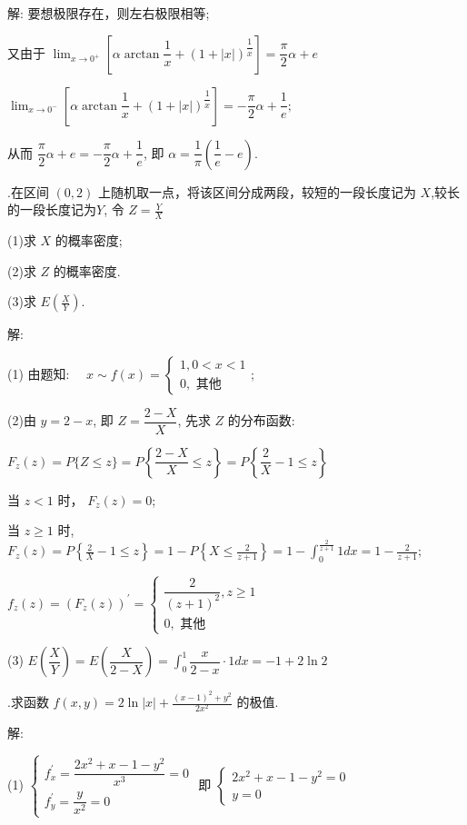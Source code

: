\documentclass{article}
\begin{document}
解: 要想极限存在，则左右极限相等;

又由于 $\lim _{x \rightarrow 0^{+}}\left[\alpha \arctan \dfrac{1}{x}+\left(1+|x|\right)^{\dfrac{1}{x}}\right]=\dfrac{\pi}{2} \alpha+e $

$\lim _{x \rightarrow 0^{-}}\left[\alpha \arctan \dfrac{1}{x}+(1+|x|)^{\dfrac{1}{x}}\right]=-\dfrac{\pi}{2} \alpha+\dfrac{1}{e} ;$

从而 $\dfrac{\pi}{2} \alpha+e=-\dfrac{\pi}{2} \alpha+\dfrac{1}{e}$, 即 $\alpha=\dfrac{1}{\pi}\left(\dfrac{1}{e}-e\right) .$

\vspace{1ex}
{.}在区间 $(0,2)$ 上随机取一点，将该区间分成两段，较短的一段长度记为 $X$,较长的一段长度记为$Y$, 令 $Z=\frac{Y}{X}$

(1)求 $X$ 的概率密度;

(2)求 $Z$ 的概率密度.

(3)求 $E\left(\frac{X}{Y}\right)$.

解:

(1) 由题知: $\quad x \sim f(x)=\left\{\begin{array}{c}
        1,0<x<1 \\
        0, \text { 其他 }
    \end{array} ;\right.$

(2)由 $y=2-x$, 即 $Z=\dfrac{2-X}{X}$, 先求 $Z$ 的分布函数:

$F_{z}(z)=P\{Z \leq z\}=P\left\{\dfrac{2-X}{X} \leq z\right\}=P\left\{\dfrac{2}{X}-1 \leq z\right\}$

当 $z<1$ 时， $F_{z}(z)=0$;

当 $z \geq 1$ 时, $F_{z}(z)=P\left\{\frac{2}{X}-1 \leq z\right\}=1-P\left\{X \leq \frac{2}{z+1}\right\}=1-\int_{0}^{\frac{2}{z+1}} 1 d x=1-\frac{2}{z+1} ;$

$f_{z}(z)=\left(F_{z}(z)\right)^{\prime}=\left\{\begin{array}{c}
        \dfrac{2}{(z+1)^{2}}, z \geq 1 \\
        0, \text { 其他 }
    \end{array}\right.$

(3) $E\left(\dfrac{X}{Y}\right)=E\left(\dfrac{X}{2-X}\right)=\int_{0}^{1} \dfrac{x}{2-x} \cdot 1 d x=-1+2 \ln 2$

\vspace{1ex}
{.}求函数 $f(x, y)=2 \ln |x|+\frac{(x-1)^{2}+y^{2}}{2 x^{2}}$ 的极值.

解:

(1) $\left\{\begin{array}{l}
        f_{x}^{\prime}=\dfrac{2 x^{2}+x-1-y^{2}}{x^{3}}=0 \\
        f_{y}^{\prime}=\dfrac{y}{x^{2}}=0
    \end{array}\right.$ 即 $\left\{\begin{array}{l}
        2 x^{2}+x-1-y^{2}=0 \\
        y=0
    \end{array}\right.$
\end{document}
